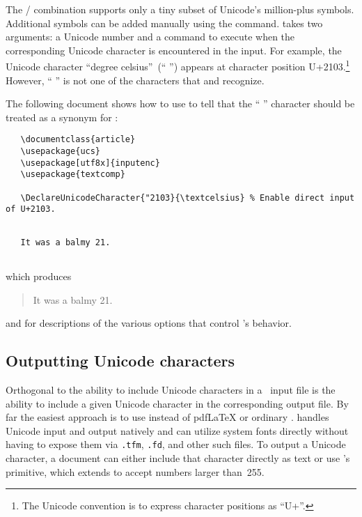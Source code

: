 The \slash{} combination supports only a
tiny subset of Unicode's million-plus symbols.  Additional symbols can
be added manually using the \cmd{\DeclareUnicodeCharacter} command.
\cmd{\DeclareUnicodeCharacter} takes two arguments: a Unicode number
and a \latex{} command to execute when the corresponding Unicode
character is encountered in the input.  For example, the Unicode
character ``degree celsius''~(``\,\textcelsius\,'') appears at
character position U+2103.\footnote{The Unicode convention is to
  express character positions as ``U+''.}
However, ``\,\texttt{\textcelsius}\,'' is not one of the characters
that  and  recognize.  

The following
document shows how to use \cmd{\DeclareUnicodeCharacter} to tell
\latex{} that the ``\,\texttt{\textcelsius}\,'' character should be
treated as a synonym for \cmdI{\textcelsius}:

\begin{verbatim}
   \documentclass{article}
   \usepackage{ucs}
   \usepackage[utf8x]{inputenc}
   \usepackage{textcomp}

   \DeclareUnicodeCharacter{"2103}{\textcelsius} % Enable direct input of U+2103.
\end{verbatim}
\noindent
\verb|   | \\
\verb|   |\texttt{It was a balmy 21\textcelsius.} \\
\verb|   |

\medskip

\noindent
which produces

\begin{quotation}
  It was a balmy 21\textcelsius.
\end{quotation}

 and for descriptions of the various options that control 's behavior.


\subsection{Outputting Unicode characters}

Orthogonal to the ability to include Unicode characters in a
\latex\ input file is the ability to include a given Unicode character
in the corresponding output file.  By far the easiest approach is to
use \xelatex instead of pdf\LaTeX{} or
ordinary \latex.  \xelatex handles Unicode input and output natively
and can utilize system fonts directly without having to expose them
via \texttt{.tfm}, \texttt{.fd}, and other such files.  To output a
Unicode character, a \xelatex document can either include that
character directly as \utfviii text or use \tex's \cmd{\char}
primitive, which \xelatex extends to accept numbers larger than~255.


